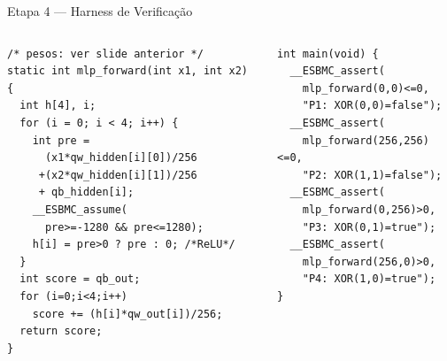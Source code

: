 \documentclass[aspectratio=169]{beamer}
\begin{document}
\begin{frame}[fragile]{Etapa 4 --- Harness de Verificação}
  \begin{columns}[T]
    \begin{lstlisting}[style=cstyle, basicstyle=\scriptsize\ttfamily, title=mlp\_forward (Q8.8)]
/* pesos: ver slide anterior */
static int mlp_forward(int x1, int x2) {
  int h[4], i;
  for (i = 0; i < 4; i++) {
    int pre =
      (x1*qw_hidden[i][0])/256
     +(x2*qw_hidden[i][1])/256
     + qb_hidden[i];
    __ESBMC_assume(
      pre>=-1280 && pre<=1280);
    h[i] = pre>0 ? pre : 0; /*ReLU*/
  }
  int score = qb_out;
  for (i=0;i<4;i++)
    score += (h[i]*qw_out[i])/256;
  return score;
}
    \end{lstlisting}

    \begin{lstlisting}[style=cstyle, basicstyle=\scriptsize\ttfamily, title=main (assertivas)]
int main(void) {
  __ESBMC_assert(
    mlp_forward(0,0)<=0,
    "P1: XOR(0,0)=false");
  __ESBMC_assert(
    mlp_forward(256,256)<=0,
    "P2: XOR(1,1)=false");
  __ESBMC_assert(
    mlp_forward(0,256)>0,
    "P3: XOR(0,1)=true");
  __ESBMC_assert(
    mlp_forward(256,0)>0,
    "P4: XOR(1,0)=true");
}
    \end{lstlisting}
  \end{columns}
\end{frame}
\end{document}
